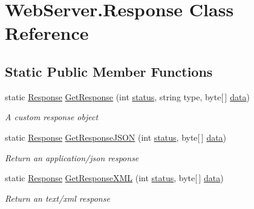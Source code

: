 \hypertarget{class_web_server_1_1_response}{}\section{Web\+Server.\+Response Class Reference}
\label{class_web_server_1_1_response}


 


\subsection*{Static Public Member Functions}
\begin{DoxyCompactItemize}
\item 
static \hyperlink{class_web_server_1_1_response}{Response} \hyperlink{class_web_server_1_1_response_ad86b4d35ec228a530f3b4752f70145ec}{Get\+Response} (int \hyperlink{class_web_server_1_1_response_a132606b61e9c9d01b80114418920c0f7}{status}, string type, byte\mbox{[}$\,$\mbox{]} \hyperlink{class_web_server_1_1_response_aa1776556ba9d3b143497693375106ea1}{data})
\begin{DoxyCompactList}\small\item\em A custom response object \end{DoxyCompactList}\item 
static \hyperlink{class_web_server_1_1_response}{Response} \hyperlink{class_web_server_1_1_response_a54c55c0b70d8091d637b0d3e606bf722}{Get\+Response\+J\+S\+ON} (int \hyperlink{class_web_server_1_1_response_a132606b61e9c9d01b80114418920c0f7}{status}, byte\mbox{[}$\,$\mbox{]} \hyperlink{class_web_server_1_1_response_aa1776556ba9d3b143497693375106ea1}{data})
\begin{DoxyCompactList}\small\item\em Return an application/json response \end{DoxyCompactList}\item 
static \hyperlink{class_web_server_1_1_response}{Response} \hyperlink{class_web_server_1_1_response_a46a3f5b6a779ff8cc33003532cca0a42}{Get\+Response\+X\+ML} (int \hyperlink{class_web_server_1_1_response_a132606b61e9c9d01b80114418920c0f7}{status}, byte\mbox{[}$\,$\mbox{]} \hyperlink{class_web_server_1_1_response_aa1776556ba9d3b143497693375106ea1}{data})
\begin{DoxyCompactList}\small\item\em Return an text/xml response \end{DoxyCompactList}\item 

\end{DoxyCompactItemize}
